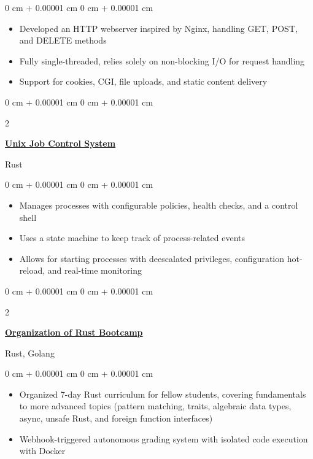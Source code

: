 \documentclass[10pt, letterpaper]{article}
\newenvironment{highlights}{
    \begin{itemize}[
        topsep=0.10 cm,
        parsep=0.10 cm,
        partopsep=0pt,
        itemsep=0pt,
        leftmargin=0 cm + 10pt
    ]
}{
    \end{itemize}
}
\newenvironment{onecolentry}{
    \begin{adjustwidth}{
        0 cm + 0.00001 cm
    }{
        0 cm + 0.00001 cm
    }
}{
    \end{adjustwidth}
}
\newenvironment{twocolentry}[2][]{
    \onecolentry
    \def\secondColumn{#2}
    \setcolumnwidth{\fill, 4.5 cm}
    \begin{paracol}{2}
}{
    \switchcolumn \raggedleft \secondColumn
    \end{paracol}
    \endonecolentry
}
\begin{document}
    \vspace{0.10 cm}
    
    \begin{onecolentry}
        \begin{highlights}
            \item Developed an HTTP webserver inspired by Nginx, handling GET, POST, and DELETE methods
            \item Fully single-threaded, relies solely on non-blocking I/O for request handling
            \item Support for cookies, CGI, file uploads, and static content delivery
        \end{highlights}
    \end{onecolentry}

    \vspace{0.2 cm}

    \begin{twocolentry}
        {Rust}
        \href{https://github.com/winstonallo/taskmaster}{\textbf{Unix Job Control System}}
    \end{twocolentry}

    \vspace{0.10 cm}
    
    \begin{onecolentry}
        \begin{highlights}
            \item Manages processes with configurable policies, health checks, and a control shell
            \item Uses a state machine to keep track of process-related events
            \item Allows for starting processes with deescalated privileges, configuration hot-reload, and real-time monitoring 
        \end{highlights}
    \end{onecolentry}

    \vspace{0.2cm}

    \begin{twocolentry}
        {Rust, Golang}
        \href{https://github.com/42-Short/shortinette}{\textbf{Organization of Rust Bootcamp}}
    \end{twocolentry}

    \vspace{0.10 cm}

    \begin{onecolentry}
        \begin{highlights}
            \item Organized 7-day Rust curriculum for fellow students, covering fundamentals to more advanced topics (pattern matching, traits, algebraic data types, async, unsafe Rust, and foreign function interfaces)
            \item Webhook-triggered autonomous grading system with isolated code execution with Docker
        \end{highlights}
    \end{onecolentry}
\end{document}
